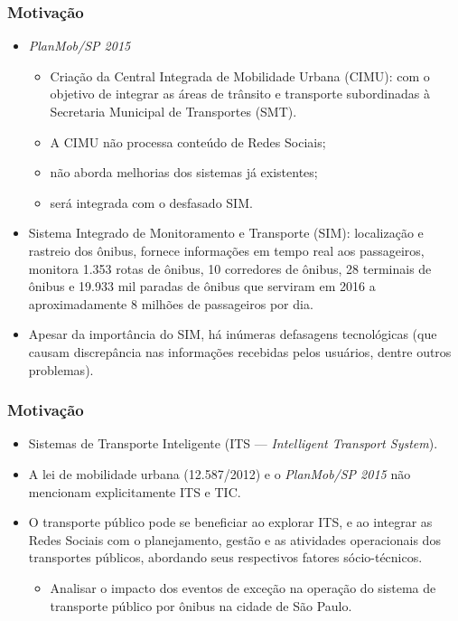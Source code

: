 \documentclass{beamer}
\begin{document}
\begin{frame}
\frametitle{Motivação}
\begin{itemize}
\item \textit{PlanMob/SP 2015}
\begin{itemize}
\item Criação da Central Integrada de Mobilidade Urbana (CIMU): com o objetivo de integrar as áreas de trânsito e transporte subordinadas à Secretaria Municipal de Transportes (SMT).
\item A CIMU não processa conteúdo de Redes Sociais;
\item não aborda melhorias dos sistemas já existentes;
\item será integrada com o desfasado SIM.
\end{itemize}
\end{itemize}

\begin{itemize}
\item Sistema Integrado de Monitoramento e Transporte (SIM): localização e rastreio dos ônibus, fornece informações em tempo real aos passageiros, monitora 1.353 rotas de ônibus, 10 corredores de ônibus, 28 terminais de ônibus e 19.933 mil paradas de ônibus que serviram em 2016 a aproximadamente 8 milhões de passageiros por dia. \item Apesar da importância do SIM, há inúmeras defasagens tecnológicas (que causam discrepância nas informações recebidas pelos usuários, dentre outros problemas).
\end{itemize}
\end{frame}
\begin{frame}
\frametitle{Motivação}
\begin{itemize}
\item Sistemas de Transporte Inteligente (ITS --- \textit{Intelligent Transport System}).
\item A lei de mobilidade urbana (12.587/2012) e o \textit{PlanMob/SP 2015} não mencionam explicitamente ITS e TIC.
\end{itemize}
\begin{itemize}
\item O transporte público pode se beneficiar ao explorar ITS, e ao integrar as Redes Sociais com o planejamento, gestão e as atividades operacionais dos transportes públicos, abordando seus respectivos fatores sócio-técnicos.
\begin{itemize}
\item Analisar o impacto dos eventos de exceção na operação do sistema de transporte público por ônibus na cidade de São Paulo.
\end{itemize}
\end{itemize}
\end{frame}
\end{document}
